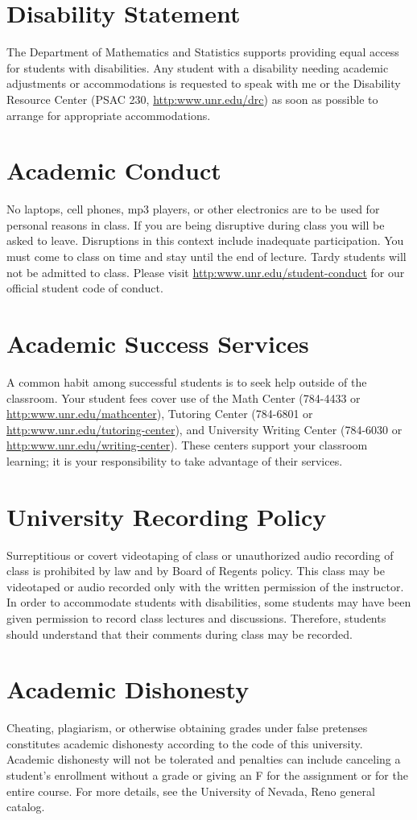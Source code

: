 \documentclass[11pt,onecolumn]{article}
\begin{document}
\section*{Disability Statement}
The Department of Mathematics and Statistics supports providing equal access for students with disabilities. Any student with a disability needing academic adjustments or accommodations is requested to speak with me or the Disability Resource Center (PSAC 230, \url{http:www.unr.edu/drc}) as soon as possible to arrange for appropriate accommodations.

\section*{Academic Conduct}
No laptops, cell phones, mp3 players, or other electronics are to be used for personal reasons in class. If you are being disruptive during class you will be asked to leave. Disruptions in this context include inadequate participation. You must come to class on time and stay until the end of lecture. Tardy students will not be admitted to class. Please visit \url{http:www.unr.edu/student-conduct} for our official student code of conduct.

\section*{Academic Success Services}
A common habit among successful students is to seek help outside of the classroom. Your student fees cover use of the Math Center (784-4433 or \url{http:www.unr.edu/mathcenter}), Tutoring Center (784-6801 or \url{http:www.unr.edu/tutoring-center}), and University Writing Center (784-6030 or \url{http:www.unr.edu/writing-center}). These centers support your classroom learning; it is your responsibility to take advantage of their services.

\section*{University Recording Policy}
Surreptitious or covert videotaping of class or unauthorized audio recording of class is prohibited by law and by Board of Regents policy. This class may be videotaped or audio recorded only with the written permission of the instructor. In order to accommodate students with disabilities, some students may have been given permission to record class lectures and discussions. Therefore, students should understand that their comments during class may be recorded.

\section*{Academic Dishonesty}
Cheating, plagiarism, or otherwise obtaining grades under false pretenses constitutes academic dishonesty according to the code of this university. Academic dishonesty will not be tolerated and penalties can include canceling a student’s enrollment without a grade or giving an F for the assignment or for the entire course. For more details, see the University of Nevada, Reno general catalog.
\end{document}
